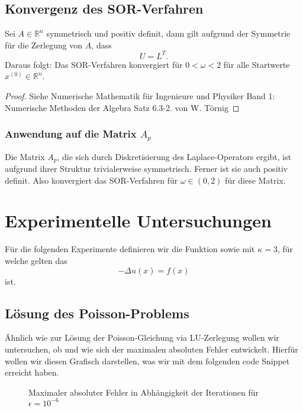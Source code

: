 \documentclass{scrartcl}
\begin{document}
\subsection{Konvergenz des SOR-Verfahren}
\begin{theorem}
    Sei \(A \in \mathbb{R}^n\) symmetrisch und positiv definit, dann gilt aufgrund der Symmetrie
    für die Zerlegung von \(A\), dass
    \[U = L^T.\]
    Daraus folgt: Das SOR-Verfahren konvergiert für \(0 < \omega < 2\) für alle
    Startwerte \(x^{(0)} \in \mathbb{R}^n\).

\end{theorem}

\begin{proof}
    Siehe Numerische Mathematik für Ingenieure und Physiker
    Band 1: Numerische Methoden der Algebra Satz 6.3-2. von W. Törnig
\end{proof}

\subsubsection{Anwendung auf die Matrix \(A_{p}\)}
Die Matrix \(A_p\), die sich durch Diskretisierung des Laplace-Operators ergibt, ist aufgrund ihrer Struktur trivialerweise symmetrisch. Ferner ist sie auch positiv definit\cite{PosDef}.
Also konvergiert das SOR-Verfahren für \(\omega \in (0, 2)\) für diese Matrix.

\section{Experimentelle Untersuchungen}

Für die folgenden Experimente definieren wir die Funktion  sowie
 mit \(\kappa = 3\), für welche gelten das
\[
    - \Delta u(x) = f(x)
\]
ist.

\subsection{Lösung des Poisson-Problems}

Ähnlich wie zur Lösung der Poisson-Gleichung via LU-Zerlegung wollen wir
untersuchen, ob und wie sich der maximalen absoluten Fehler entwickelt.
Hierfür wollen wir diesen Grafisch darstellen, was wir mit dem folgenden code
Snippet erreicht haben.


\begin{figure}[H]
    \centering
    \caption{Maximaler absoluter Fehler in Abhängigkeit der Iterationen für
        $\epsilon = 10^{-6}$}
    \label{fig:error_plot_eps1}
\end{figure}
\end{document}
